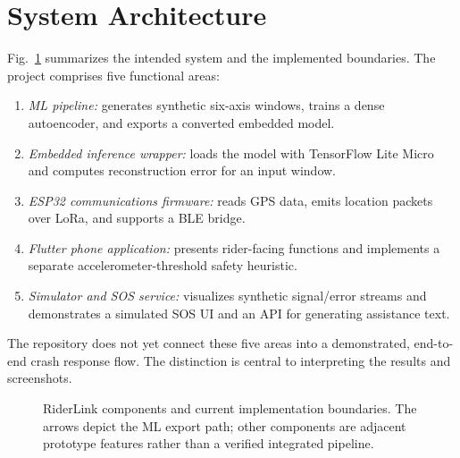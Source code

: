 \documentclass[conference]{IEEEtran}
\begin{document}
\section{System Architecture}
Fig.~\ref{fig:architecture} summarizes the intended system and the implemented boundaries. The project comprises five functional areas:
\begin{enumerate}
\item \textit{ML pipeline:} generates synthetic six-axis windows, trains a dense autoencoder, and exports a converted embedded model.
\item \textit{Embedded inference wrapper:} loads the model with TensorFlow Lite Micro and computes reconstruction error for an input window.
\item \textit{ESP32 communications firmware:} reads GPS data, emits location packets over LoRa, and supports a BLE bridge.
\item \textit{Flutter phone application:} presents rider-facing functions and implements a separate accelerometer-threshold safety heuristic.
\item \textit{Simulator and SOS service:} visualizes synthetic signal/error streams and demonstrates a simulated SOS UI and an API for generating assistance text.
\end{enumerate}
The repository does not yet connect these five areas into a demonstrated, end-to-end crash response flow. The distinction is central to interpreting the results and screenshots.

\begin{figure}[t]
\centering
{}
\caption{RiderLink components and current implementation boundaries. The arrows depict the ML export path; other components are adjacent prototype features rather than a verified integrated pipeline.}
\label{fig:architecture}
\end{figure}
\end{document}
